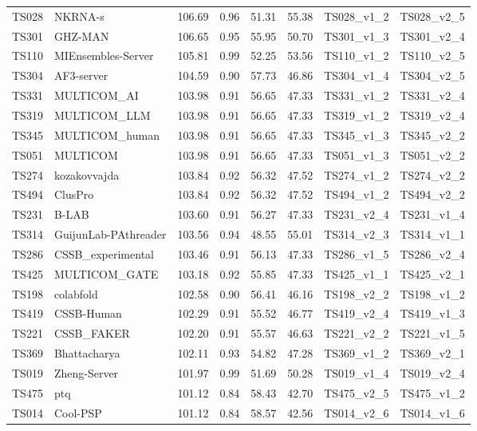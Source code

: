 \begin{table}[ht]
{\begin{tabular}{llllllll}
TS028 & NKRNA-s & 106.69 & 0.96 & 51.31 & 55.38 & TS028\_v1\_2 & TS028\_v2\_5 \\ 
TS301 & GHZ-MAN & 106.65 & 0.95 & 55.95 & 50.70 & TS301\_v1\_3 & TS301\_v2\_4 \\ 
TS110 & MIEnsembles-Server & 105.81 & 0.99 & 52.25 & 53.56 & TS110\_v1\_2 & TS110\_v2\_5 \\ 
TS304 & AF3-server & 104.59 & 0.90 & 57.73 & 46.86 & TS304\_v1\_4 & TS304\_v2\_5 \\ 
TS331 & MULTICOM\_AI & 103.98 & 0.91 & 56.65 & 47.33 & TS331\_v1\_2 & TS331\_v2\_4 \\ 
TS319 & MULTICOM\_LLM & 103.98 & 0.91 & 56.65 & 47.33 & TS319\_v1\_2 & TS319\_v2\_4 \\ 
TS345 & MULTICOM\_human & 103.98 & 0.91 & 56.65 & 47.33 & TS345\_v1\_3 & TS345\_v2\_2 \\ 
TS051 & MULTICOM & 103.98 & 0.91 & 56.65 & 47.33 & TS051\_v1\_3 & TS051\_v2\_2 \\ 
TS274 & kozakovvajda & 103.84 & 0.92 & 56.32 & 47.52 & TS274\_v1\_2 & TS274\_v2\_2 \\ 
TS494 & ClusPro & 103.84 & 0.92 & 56.32 & 47.52 & TS494\_v1\_2 & TS494\_v2\_2 \\ 
TS231 & B-LAB & 103.60 & 0.91 & 56.27 & 47.33 & TS231\_v2\_4 & TS231\_v1\_4 \\ 
TS314 & GuijunLab-PAthreader & 103.56 & 0.94 & 48.55 & 55.01 & TS314\_v2\_3 & TS314\_v1\_1 \\ 
TS286 & CSSB\_experimental & 103.46 & 0.91 & 56.13 & 47.33 & TS286\_v1\_5 & TS286\_v2\_4 \\ 
TS425 & MULTICOM\_GATE & 103.18 & 0.92 & 55.85 & 47.33 & TS425\_v1\_1 & TS425\_v2\_1 \\ 
TS198 & colabfold & 102.58 & 0.90 & 56.41 & 46.16 & TS198\_v2\_2 & TS198\_v1\_2 \\ 
TS419 & CSSB-Human & 102.29 & 0.91 & 55.52 & 46.77 & TS419\_v2\_4 & TS419\_v1\_3 \\ 
TS221 & CSSB\_FAKER & 102.20 & 0.91 & 55.57 & 46.63 & TS221\_v2\_2 & TS221\_v1\_5 \\ 
TS369 & Bhattacharya & 102.11 & 0.93 & 54.82 & 47.28 & TS369\_v1\_2 & TS369\_v2\_1 \\ 
TS019 & Zheng-Server & 101.97 & 0.99 & 51.69 & 50.28 & TS019\_v1\_4 & TS019\_v2\_4 \\ 
TS475 & ptq & 101.12 & 0.84 & 58.43 & 42.70 & TS475\_v2\_5 & TS475\_v1\_2 \\ 
TS014 & Cool-PSP & 101.12 & 0.84 & 58.57 & 42.56 & TS014\_v2\_6 & TS014\_v1\_6 \\ 

\end{tabular}}
\end{table}
